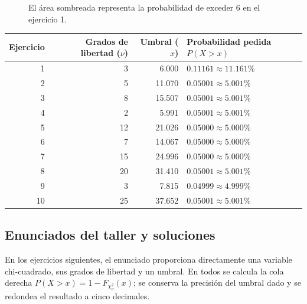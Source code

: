 \documentclass[11pt]{article}
\begin{document}
\begin{figure}[htbp]
\centering
{}
\caption{El área sombreada representa la probabilidad de exceder 6 en el ejercicio 1.}
\label{fig:chi-cola}
\end{figure}

\begin{center}
\small
\begin{tabular}{r r r l}
\toprule
Ejercicio & Grados de libertad ($\nu$) & Umbral ($x$) & Probabilidad pedida $P(X>x)$ \\
\midrule
1  & 3  & 6.000   & $0.11161\approx 11.161\%$ \\
2  & 5  & 11.070  & $0.05001\approx 5.001\%$ \\
3  & 8  & 15.507  & $0.05001\approx 5.001\%$ \\
4  & 2  & 5.991   & $0.05001\approx 5.001\%$ \\
5  & 12 & 21.026  & $0.05000\approx 5.000\%$ \\
6  & 7  & 14.067  & $0.05000\approx 5.000\%$ \\
7  & 15 & 24.996  & $0.05000\approx 5.000\%$ \\
8  & 20 & 31.410  & $0.05001\approx 5.001\%$ \\
9  & 3  & 7.815   & $0.04999\approx 4.999\%$ \\
10 & 25 & 37.652  & $0.05001\approx 5.001\%$ \\
\bottomrule
\end{tabular}
\end{center}

\subsection{Enunciados del taller y soluciones}
En los ejercicios siguientes, el enunciado proporciona directamente una variable chi-cuadrado, sus grados de libertad y un umbral. En todos se calcula la cola derecha $P(X>x)=1-F_{\chi^2_\nu}(x)$; se conserva la precisión del umbral dado y se redondea el resultado a cinco decimales.
\end{document}
